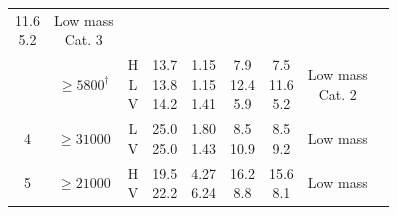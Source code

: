 \begin{table}
\begin{tabular}{@{}ccccccccc}
\subrows{11.6\\5.2} & \subrows{Low mass\\Cat. 3}\\ \cline{2-8}
      & $\geq 5800^{\dagger}$ &  \subrows{H\\L\\V} & \subrows{13.7\\13.8\\14.2} 
& \subrows{1.15\\1.15\\1.41} & \subrows{7.9\\12.4\\5.9} & 
\subrows{7.5\\11.6\\5.2} & \subrows{Low mass\\Cat. 2} 
\\ 
     \hline
    4 & $\geq 31000$ & \subrows{L\\V} & \subrows{25.0\\25.0} & 
\subrows{1.80\\1.43} & \subrows{8.5\\10.9} & 
\subrows{8.5\\9.2} & Low mass \\ 
     \hline
    5 & $\geq 21000$ & \subrows{H\\V} & \subrows{19.5\\22.2} & 
\subrows{4.27\\6.24} & \subrows{16.2\\8.8} & 
\subrows{15.6\\8.1} & Low mass \\ 

\end{tabular}
\end{table}

